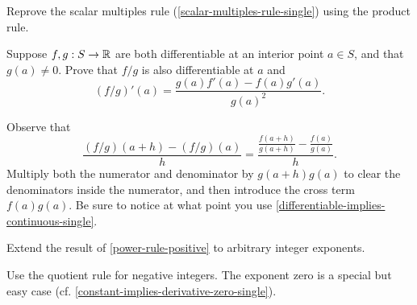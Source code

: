 \begin{exercise}
	 Reprove the scalar multiples rule (\cref{scalar-multiples-rule-single}) using the product rule. 
\end{exercise}

\begin{exercise} \label{quotient-rule-single} 
	Suppose $f, g : S \to \mathbb{R}$ are both differentiable at an interior point $a \in S$, and that $g(a) \neq 0$. Prove that $f/g$ is also differentiable at $a$ and 
	\[ (f/g)'(a) = \frac{g(a)f'(a) - f(a)g'(a)}{g(a)^2}. \] 
	\begin{hint} Observe that \[ \frac{(f/g)(a+h)-(f/g)(a)}{h} = \frac{\frac{f(a+h)}{g(a+h)} - \frac{f(a)}{g(a)} }{h}. \]
	Multiply both the numerator and denominator by $g(a+h)g(a)$ to clear the denominators inside the numerator, and then introduce the cross term $f(a)g(a)$. Be sure to notice at what point you use \cref{differentiable-implies-continuous-single}.
	\end{hint}
\end{exercise}

\begin{comment}
	Again, the proof is a clever algebraic manipulation of difference quotients! There are now two tricks: clearing denominators, and then introducing a cross term $f(a)g(a)$. 
	\[ \begin{aligned} \frac{(f/g)(a+h)-(f/g)(a)}{h} &= \frac{\frac{f(a+h)}{g(a+h)} - \frac{f(a)}{g(a)} }{h} \\ 
	&= \frac{g(a+h)g(a)}{g(a+h)g(a)} \cdot \frac{\frac{f(a+h)}{g(a+h)} - \frac{f(a)}{g(a)} }{h} \\
	&= \frac{1}{g(a+h)g(a)} \frac{f(a+h)g(a) - f(a)g(a+h)}{h} \\
	&= \frac{1}{g(a+h)g(a)} \frac{f(a+h)g(a) {\color{blue}- f(a)g(a) + f(a)g(a)} - f(a)g(a+h)}{h} \\ 
	&= \frac{1}{g(a+h)g(a)} \left( \frac{f(a+h)g(a) - f(a)g(a)}{h} + \frac{f(a)g(a) - f(a)g(a+h)}{h} \right) \\
	&= \frac{1}{g(a+h)g(a)} \left( \frac{f(a+h) - f(a)}{h} \cdot g(a) + f(a) \cdot \frac{g(a) - g(a+h)}{h} \right) \end{aligned} \]
\end{comment}

\begin{exercise} \label{power-rule-integer} 
	Extend the result of \cref{power-rule-positive} to arbitrary integer exponents. 
	\begin{hint} Use the quotient rule for negative integers. The exponent zero is a special but easy case (cf. \cref{constant-implies-derivative-zero-single}).  
	\end{hint}
\end{exercise}


